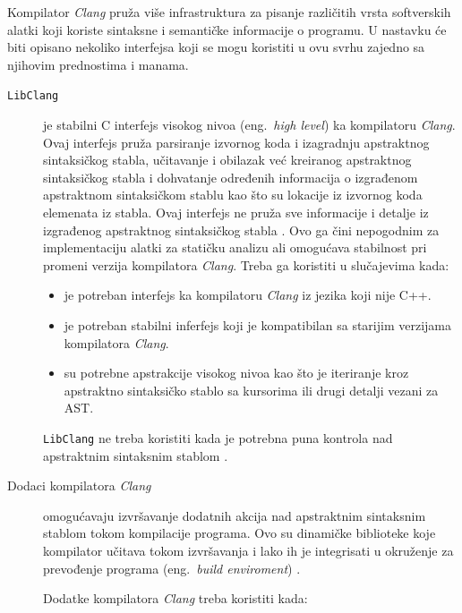 \documentclass[12pt,oneside]{memoir}
\begin{document}
 Kompilator \textit{Clang} pru\v{z}a vi\v{s}e infrastruktura za pisanje razli\v{c}itih vrsta softverskih alatki koji koriste sintaksne i semanti\v{c}ke informacije o programu. U nastavku \'{c}e biti opisano nekoliko interfejsa koji se mogu koristiti u ovu svrhu zajedno sa njihovim prednostima i manama.


\begin{description}
\item[\texttt{LibClang}] je stabilni C interfejs visokog nivoa (eng.~\textit{high level}) ka kompilatoru \textit{Clang}. Ovaj interfejs pru\v{z}a parsiranje izvornog koda
i izagradnju apstraktnog sintaksi\v{c}kog stabla, u\v{c}itavanje i obilazak ve\'{c} kreiranog apstraktnog sintaksi\v{c}kog stabla i dohvatanje određenih informacija o izgrađenom apstraktnom sintaksi\v{c}kom stablu kao \v{s}to su lokacije iz izvornog koda elemenata iz stabla. Ovaj interfejs ne pru\v{z}a sve informacije i detalje iz izgrađenog apstraktnog sintaksi\v{c}kog stabla \cite{LibClang}. Ovo ga \v{c}ini nepogodnim za implementaciju alatki za stati\v{c}ku analizu ali omogu\'{c}ava stabilnost pri promeni verzija kompilatora \textit{Clang}.
Treba ga koristiti u slu\v{c}ajevima kada:
\begin{itemize}
  \item je potreban interfejs ka kompilatoru \textit{Clang} iz jezika koji nije C++.
  \item je potreban stabilni inferfejs koji je kompatibilan sa starijim verzijama kompilatora \textit{Clang}.
  \item su potrebne apstrakcije visokog nivoa kao \v{s}to je iteriranje kroz apstraktno sintaksi\v{c}ko stablo sa kursorima ili drugi detalji vezani za AST.
\end{itemize}
\texttt{LibClang} ne treba koristiti kada je potrebna puna kontrola nad apstraktnim sintaksnim stablom \cite{RightInterface}.

\item[Dodaci kompilatora \textit{Clang}] omogu\'{c}avaju izvr\v{s}avanje dodatnih akcija nad apstraktnim sintaksnim stablom tokom kompilacije programa. 
Ovo su dinami\v{c}ke biblioteke koje kompilator u\v{c}itava tokom izvr\v{s}avanja i lako ih je integrisati u okru\v{z}enje za prevođenje programa (eng.~\textit{build enviroment}) \cite{ClangPlugins}.

Dodatke kompilatora \textit{Clang} treba koristiti kada:


\end{description}
\end{document}
